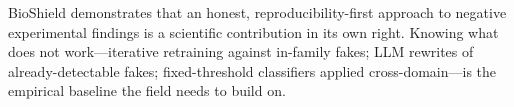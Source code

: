 \documentclass[12pt,a4paper]{article}
\begin{document}
BioShield demonstrates that an honest, reproducibility-first approach to
negative experimental findings is a scientific contribution in its own right.
Knowing what does not work—iterative retraining against in-family fakes; LLM
rewrites of already-detectable fakes; fixed-threshold classifiers applied
cross-domain—is the empirical baseline the field needs to build on.

\newpage


\end{document}
